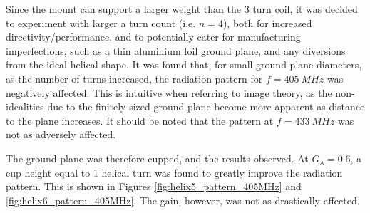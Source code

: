 Since the mount can support a larger weight than the 3 turn coil, it was decided to experiment with larger a turn count (i.e. $n=4$), both for increased directivity/performance, and to potentially cater for manufacturing imperfections, such as a thin aluminium foil ground plane, and any diversions from the ideal helical shape. It was found that, for small ground plane diameters, as the number of turns increased, the radiation pattern for $f = \SI{405}{MHz}$ was negatively affected. This is intuitive when referring to image theory, as the non-idealities due to the finitely-sized ground plane become more apparent as distance to the plane increases. It should be noted that the pattern at $f = \SI{433}{MHz}$ was not as adversely affected.

The ground plane was therefore cupped, and the results observed. At $G_\lambda = 0.6$, a cup height equal to 1 helical turn was found to greatly improve the radiation pattern. This is shown in Figures \ref{fig:helix5_pattern_405MHz} and \ref{fig:helix6_pattern_405MHz}. The gain, however, was not as drastically affected.

